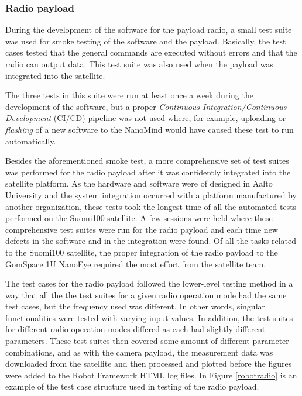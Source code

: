 \documentclass[english,12pt,a4paper,pdftex,elec,utf8]{aaltothesis}
\begin{document}
\subsubsection{Radio payload}
During the development of the software for the payload radio, a small test suite was used for smoke testing of the software and the payload. Basically, the test cases tested that the general commands are executed without errors and that the radio can output data. This test suite was also used when the payload was integrated into the satellite.\par
The three tests in this suite were run at least once a week during the development of the software, but a proper \textit{Continuous Integration/Continuous Development} (CI/CD) pipeline was not used where, for example, uploading or \textit{flashing} of a new software to the NanoMind would have caused these test to run automatically.\par
Besides the aforementioned smoke test, a more comprehensive set of test suites was performed for the radio payload after it was confidently integrated into the satellite platform. As the hardware and software were of designed in Aalto University and the system integration occurred with a platform manufactured by another organization, these tests took the longest time of all the automated tests performed on the Suomi100 satellite. A few sessions were held where these comprehensive test suites were run for the radio payload and each time new defects in the software and in the integration were found. Of all the tasks related to the Suomi100 satellite, the proper integration of the radio payload to the GomSpace 1U NanoEye required the most effort from the satellite team.\par
The test cases for the radio payload followed the lower-level testing method in a way that all the the test suites for a given radio operation mode had the same test cases, but the frequency used was different. In other words, singular functionalities were tested with varying input values. In addition, the test suites for different radio operation modes differed as each had slightly different parameters. These test suites then covered some amount of different parameter combinations, and as with the camera payload, the measurement data was downloaded from the satellite and then processed and plotted before the figures were added to the Robot Framework HTML log files. In Figure \ref{robotradio} is an example of the test case structure used in testing of the radio payload.\par 
\end{document}
